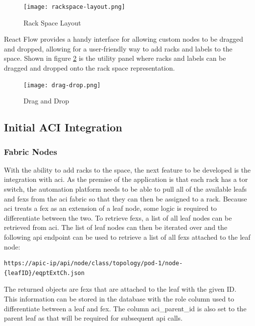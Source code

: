 \begin{figure}[H]
    \centering
    \texttt{[image: rackspace-layout.png]}
    \caption{Rack Space Layout}
    \label{fig:rackspace-layout}
\end{figure}

React Flow provides a handy interface for allowing custom nodes to be dragged and dropped, allowing for a user-friendly way to add racks and labels to the space. Shown in figure \ref{fig:drag-drop} is the utility panel where racks and labels can be dragged and dropped onto the rack space representation.

\begin{figure}[H]
    \centering
    \texttt{[image: drag-drop.png]}
    \caption{Drag and Drop}
    \label{fig:drag-drop}
\end{figure}

\subsection{Initial ACI Integration}
\subsubsection{Fabric Nodes}
With the ability to add racks to the space, the next feature to be developed is the integration with \gls{aci}. As the premise of the application is that each rack has a \gls{tor} switch, the automation platform needs to be able to pull all of the available leafs and \gls{fex}s from the \gls{aci} fabric so that they can then be assigned to a rack. Because \gls{aci} treats a \gls{fex} as an extension of a leaf node, some logic is required to differentiate between the two.
To retrieve \gls{fex}s, a list of all leaf nodes can be retrieved from \gls{aci}. The list of leaf nodes can then be iterated over and the following \gls{api} endpoint can be used to retrieve a list of all \gls{fex}s attached to the leaf node:
\begin{verbatim}
https://apic-ip/api/node/class/topology/pod-1/node-{leafID}/eqptExtCh.json
\end{verbatim}

The returned objects are \gls{fex}s that are attached to the leaf with the given ID. This information can be stored in the database with the role column used to differentiate between a leaf and \gls{fex}. The column aci\_parent\_id is also set to the parent leaf as that will be required for subsequent \gls{api} calls.

